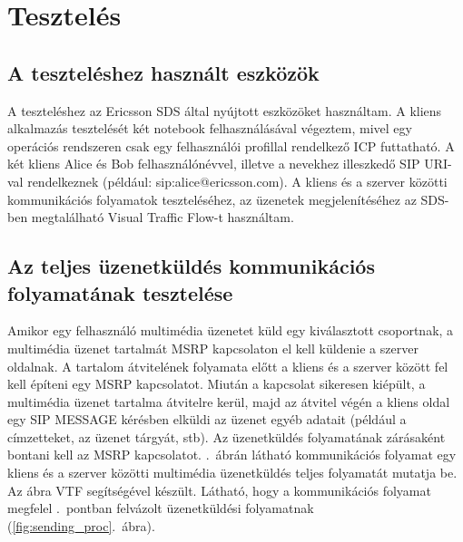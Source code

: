 
\section{Tesztelés}

\subsection{A teszteléshez használt eszközök}
\label{sec:tesztelesi_eszkozok}

A teszteléshez az Ericsson SDS által nyújtott eszközöket használtam. A kliens alkalmazás tesztelését két notebook felhasználásával végeztem, mivel egy operációs rendszeren csak egy felhasználói profillal rendelkező ICP futtatható. A két kliens Alice és Bob felhasználónévvel, illetve a nevekhez illeszkedő SIP URI-val rendelkeznek (például: sip:alice@ericsson.com). A kliens és a szerver közötti kommunikációs folyamatok teszteléséhez, az üzenetek megjelenítéséhez az SDS-ben megtalálható Visual Traffic Flow-t használtam. 

\subsection{Az teljes üzenetküldés kommunikációs folyamatának tesztelése}
\label{sec:teszteles_teljes_kuldes}

Amikor egy felhasználó multimédia üzenetet küld egy kiválasztott csoportnak, a multimédia üzenet tartalmát MSRP kapcsolaton el kell küldenie a szerver oldalnak. A tartalom átvitelének folyamata előtt a kliens és a szerver között fel kell építeni egy MSRP kapcsolatot. Miután a kapcsolat sikeresen kiépült, a multimédia üzenet tartalma átvitelre kerül, majd az átvitel végén a kliens oldal egy SIP MESSAGE kérésben elküldi az üzenet egyéb adatait (például a címzetteket, az üzenet tárgyát, stb). Az üzenetküldés folyamatának zárásaként bontani kell az MSRP kapcsolatot. .~ábrán látható kommunikációs folyamat egy kliens és a szerver közötti multimédia üzenetküldés teljes folyamatát mutatja be. Az ábra VTF segítségével készült. Látható, hogy a kommunikációs folyamat megfelel .~pontban felvázolt üzenetküldési folyamatnak (\ref{fig:sending_proc}.~ábra).

